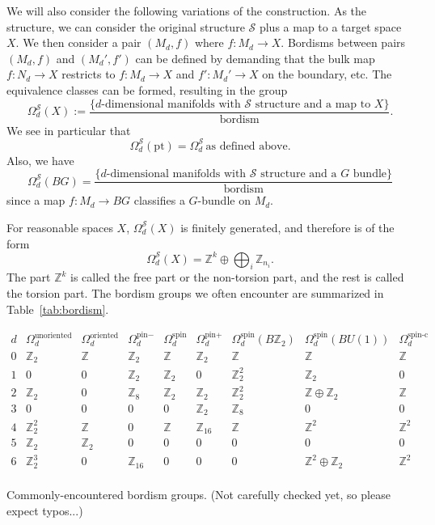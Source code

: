 \documentclass[12pt]{article}
\numberwithin{equation}{section}
\numberwithin{figure}{section}
\theoremstyle{remark}
\renewenvironment{table}[1][]{
  \begin{originaltable}[#1]
    \begin{mdframed}[linecolor=black!0,backgroundcolor=black!1]
}{
    \end{mdframed}
  \end{originaltable}
}
\def\bZ{\mathbb{Z}}
\def\cS{\mathcal{S}}
\def\pt{\mathrm{pt}}
\begin{document}
We will also consider the following variations of the construction.
As the structure, we can consider the original structure $\cS$ plus a map to a target space $X$.
We then consider a pair $(M_d, f)$ where $f:M_d\to X$.
Bordisms between pairs $(M_d,f)$ and $(M_d',f')$ can be defined by demanding that 
the bulk map $f:N_d\to X$ restricts to $f:M_d\to X$ and $f':M_d'\to X$ on the boundary, etc.
The equivalence classes can be formed, resulting in the group \begin{equation}
\Omega^\cS_d(X) := \frac{
\{\text{$d$-dimensional manifolds with $\cS$ structure and a map to $X$} \} 
} { \text{bordism} }.
\end{equation}
We see in particular that \begin{equation}
\Omega^\cS_d(\pt) =\Omega^\cS_d\, \text{as defined above}.
\end{equation}
Also, we have \begin{equation}
\Omega^\cS_d(BG) =\frac{
\{\text{$d$-dimensional manifolds with $\cS$ structure and a $G$ bundle} \} 
} { \text{bordism} }
\end{equation}
since a map $f: M_d\to BG$ classifies a $G$-bundle on $M_d$.

For reasonable spaces $X$, $\Omega^\cS_d(X)$ is finitely generated,
and therefore is of the form \begin{equation}
\Omega^\cS_d(X) = \bZ^k \oplus \bigoplus_i \bZ_{n_i}.
\end{equation}
The part $\bZ^k$ is called the free part or the non-torsion part,
and the rest is called the torsion part.
The bordism groups we often encounter are summarized in Table~\ref{tab:bordism}.

\begin{table}
\[
\begin{array}{c||cc|ccc|ccccc}
d & \Omega^\text{unoriented}_d & \Omega^\text{oriented}_d &\Omega^\text{pin$-$}_d &
 \Omega^\text{spin}_d & \Omega^\text{pin$+$}_d 
 &  \Omega^\text{spin}_d(B\bZ_2) & \Omega^\text{spin}_d(BU(1)) & \Omega^\text{spin-c}_d\\
\hline
0 & \bZ_2 & \bZ & \bZ_2 & \bZ & \bZ_2 & \bZ & \bZ & \bZ\\
1 & 0 & 0 & \bZ_2 & \bZ_2 & 0 & \bZ_2^2  &\bZ_2& 0 \\
2&  \bZ_2 & 0 & \bZ_8 & \bZ_2 & \bZ_2 & \bZ_2^2& \bZ \oplus \bZ_2 & \bZ \\
3 & 0 & 0 & 0 & 0 & \bZ_2 & \bZ_8 &0&0\\
4 & \bZ_2^2 & \bZ & 0 & \bZ & \bZ_{16} & \bZ &\bZ^2&\bZ^2  \\
5 &  \bZ_2 & \bZ_2& 0 & 0 & 0& 0 & 0 &0 \\
6 &\bZ_2^3 & 0 & \bZ_{16} & 0 & 0 & 0 &\bZ^2 \oplus \bZ_2 & \bZ^2\\
\end{array}
\]
\caption{
Commonly-encountered bordism groups. (Not carefully checked yet, so please expect typos...)
\label{tab:bordism}}
\end{table}
\end{document}
